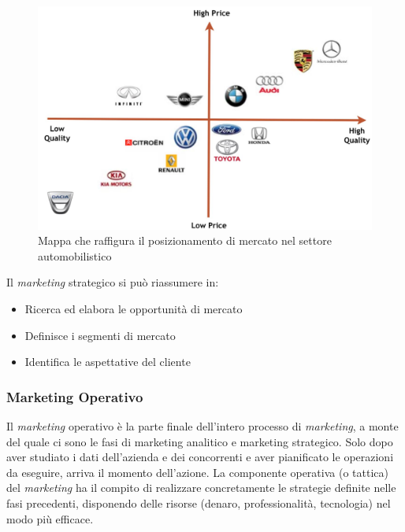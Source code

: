 \begin{figure}[h]
	\includegraphics[width=0.6\linewidth]{resources/chapters/OrganizzazioneAziendale/images/mappa-posizionamento.jpg}
	\centering
	\caption{Mappa che raffigura il posizionamento di mercato nel settore automobilistico}
\end{figure}

Il \textit{marketing} strategico si può riassumere in:
\begin{itemize}
	\item Ricerca ed elabora le opportunità di mercato
	\item Definisce i segmenti di mercato
	\item Identifica le aspettative del cliente
\end{itemize}

\newpage
\subsubsection{Marketing Operativo}
Il \textit{marketing} operativo è la parte finale dell’intero processo di \textit{marketing}, a monte del quale ci sono le fasi di marketing analitico e marketing strategico. Solo dopo aver studiato i dati dell’azienda e dei concorrenti e aver pianificato le operazioni da eseguire, arriva il momento dell’azione. La componente operativa (o tattica) del \textit{marketing} ha il compito di realizzare concretamente le strategie definite nelle fasi precedenti, disponendo delle risorse (denaro, professionalità, tecnologia) nel modo più efficace.


